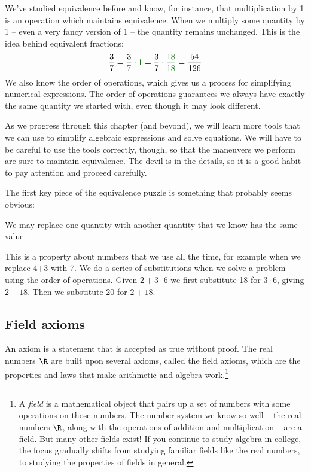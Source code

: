 We've studied equivalence before and know, for instance, that multiplication by 1 is an operation which maintains equivalence. When we multiply some quantity by 1 -- even a very fancy version of 1 -- the quantity remains unchanged. This is the idea behind equivalent fractions: \[\frac{3}{7} = \frac{3}{7}\cdot{\color{green!40!black}1} = \frac{3}{7}\cdot{\color{green!40!black}\frac{18}{18}} = \frac{54}{126}\]
We also know the order of operations, which gives us a process for simplifying numerical expressions. The order of operations guarantees we always have exactly the same quantity we started with, even though it may look different.

As we progress through this chapter (and beyond), we will learn more tools that we can use to simplify algebraic expressions and solve equations. We will have to be careful to use the tools correctly, though, so that the maneuvers we perform are sure to maintain equivalence. The devil is in the details, so it is a good habit to pay attention and proceed carefully.

The first key piece of the equivalence puzzle is something that probably seems obvious:

\begin{boxdef}[Substitution]
We may replace one quantity with another quantity that we know has the same value.
\end{boxdef}

This is a property about numbers that we use all the time, for example when we replace 4+3 with 7. We do a series of substitutions when we solve a problem using the order of operations. Given $2+3\cdot6$ we first substitute 18 for $3\cdot6$, giving $2+18$. Then we substitute 20 for $2+18$.

\subsection{Field axioms}

An \gls{axiom} is a statement that is accepted as true without proof. The real numbers $\R$ are built upon several axioms, called the \glspl{field axiom}, which are the properties and laws that make arithmetic and algebra work.\footnote{A \textit{field} is a mathematical object that pairs up a set of numbers with some operations on those numbers. The number system we know so well -- the real numbers $\R$, along with the operations of addition and multiplication -- are a field. But many other fields exist! If you continue to study algebra in college, the focus gradually shifts from studying familiar fields like the real numbers, to studying the properties of fields in general.}

